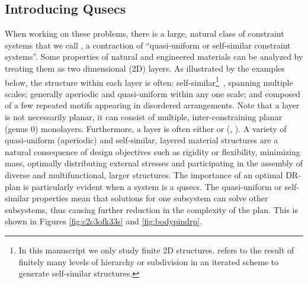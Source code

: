 


\subsection{Introducing Qusecs}
When working on these problems, there is a large, natural class of constraint systems that we call , a contraction of ``quasi-uniform or self-similar constraint systems''.
%
Some properties of natural and engineered materials can be analyzed by treating them as two dimensional (2D) layers. As illustrated by the examples below, the structure within each layer is often: self-similar\footnote{In this manuscript we only study finite 2D structures.  refers to the result of finitely many levels of hierarchy or subdivision in an iterated scheme to generate self-similar structures.}~\cite{2012arXiv1204.6389G}, spanning multiple scales; generally aperiodic and quasi-uniform within any one scale; and composed of a few repeated motifs appearing in disordered arrangements.
Note that a layer is not necessarily planar, it can consist of multiple, inter-constraining planar (genus 0) monolayers. Furthermore, a layer is often  either  or  (, \seedefsd). A variety of quasi-uniform (aperiodic) and self-similar, layered material structures are a natural consequence of design objectives such as rigidity or flexibility, minimizing mass, optimally distributing external stresses and participating in the assembly of diverse and multifunctional, larger  structures.
%
The importance of an optimal DR-plan is particularly evident when a system is a qusecs. The quasi-uniform or self-similar properties mean that solutions for one subsystem can solve other subsystems, thus causing further reduction in the complexity of the plan. This is shown in Figures \ref{fig:c2c3ofk33s} and \ref{fig:bodypindrp}.




